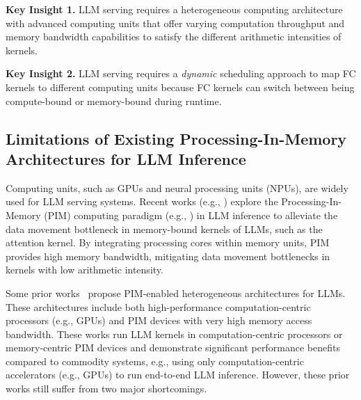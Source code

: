 \noindent\textbf{Key Insight 1.} LLM serving requires a heterogeneous computing architecture with advanced computing units that offer varying computation throughput and memory bandwidth capabilities to satisfy the different arithmetic intensities of kernels. 

\noindent\textbf{Key Insight 2.} LLM serving requires a \emph{dynamic} scheduling approach to map FC kernels to different computing units because FC kernels can switch between being compute-bound or memory-bound during runtime.



\subsection{Limitations of Existing Processing-In-Memory Architectures for LLM Inference}


Computing units, such as GPUs and neural processing units (NPUs), are widely used for LLM serving systems. 
Recent works (e.g., \cite{park2024attacc,seo2024ianus, heo2024neupims,li2024specpim, pan2024instinfer, ortega2024pim, kwon2024lol, gao2024imi, lee2024cost, jeong2024pipepim, zhou2022transpim}) explore the Processing-In-Memory (PIM) computing paradigm (e.g., \cite{aga2017compute, ahn2015scalable, ferreira2021pluto, li2017drisa, seshadri2017ambit, seshadri2015fast, he2021tare, he2020towards, he2019agile}) in LLM inference to alleviate the data movement bottleneck in memory-bound kernels of LLMs, such as the attention kernel.
By integrating processing cores within memory units, PIM provides high memory bandwidth, mitigating data movement bottlenecks in kernels with low arithmetic intensity.


Some prior works~\cite{park2024attacc, seo2024ianus, heo2024neupims, li2024specpim, pan2024instinfer} propose PIM-enabled heterogeneous architectures for LLMs. These architectures include both high-performance computation-centric processors (e.g., GPUs) and PIM devices with very high memory access bandwidth. These works run LLM kernels in computation-centric processors or memory-centric PIM devices and demonstrate significant performance benefits compared to commodity systems, e.g., using only computation-centric accelerators (e.g., GPUs) to run end-to-end LLM inference. However, these prior works still suffer from two major shortcomings.

